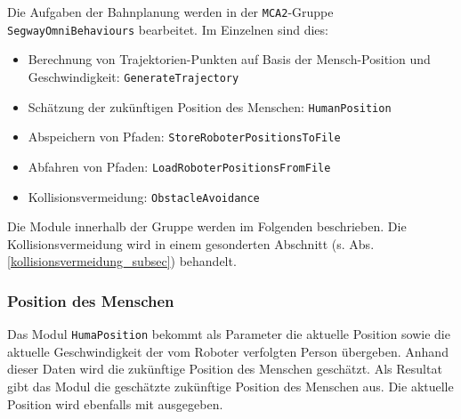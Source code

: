 Die Aufgaben der Bahnplanung werden in der \lstinline{MCA2}-Gruppe \lstinline{SegwayOmniBehaviours} bearbeitet.
Im Einzelnen sind dies:
\begin{itemize}
	\item Berechnung von Trajektorien-Punkten auf Basis der Mensch-Position und Geschwindigkeit: \lstinline{GenerateTrajectory}
	\item Schätzung der zukünftigen Position des Menschen: \lstinline{HumanPosition}
	\item Abspeichern von Pfaden: \lstinline{StoreRoboterPositionsToFile}
	\item Abfahren von Pfaden: \lstinline{LoadRoboterPositionsFromFile}
	\item Kollisionsvermeidung: \lstinline{ObstacleAvoidance}
\end{itemize}

Die Module innerhalb der Gruppe werden im Folgenden beschrieben.
Die Kollisionsvermeidung wird in einem gesonderten Abschnitt (s. Abs. \ref{kollisionsvermeidung_subsec}) behandelt.



\subsubsection{Position des Menschen}


Das Modul \lstinline{HumaPosition} bekommt als Parameter die aktuelle Position sowie die aktuelle Geschwindigkeit der vom Roboter verfolgten Person übergeben.
Anhand dieser Daten wird die zukünftige Position des Menschen geschätzt.
Als Resultat gibt das Modul die geschätzte zukünftige Position des Menschen aus.
Die aktuelle Position wird ebenfalls mit ausgegeben.

